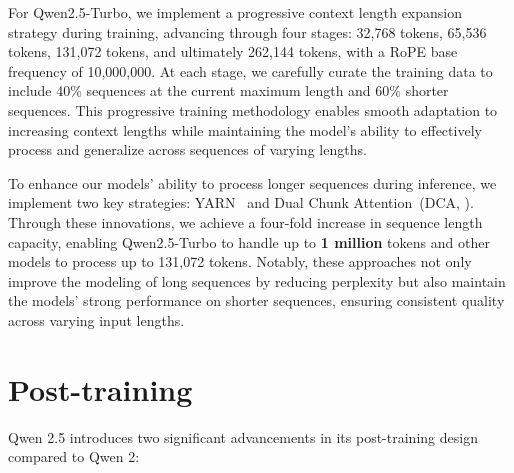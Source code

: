 \documentclass{article}
\begin{document}
For Qwen2.5-Turbo, we implement a progressive context length expansion strategy during training, advancing through four stages: 32,768 tokens, 65,536 tokens, 131,072 tokens, and ultimately 262,144 tokens, with a RoPE base frequency of 10,000,000. At each stage, we carefully curate the training data to include 40\% sequences at the current maximum length and 60\% shorter sequences. This progressive training methodology enables smooth adaptation to increasing context lengths while maintaining the model's ability to effectively process and generalize across sequences of varying lengths.

To enhance our models' ability to process longer sequences during inference, we implement two key strategies: YARN~\citep{yarn} and Dual Chunk Attention~(DCA, \citealp{chunkllama}). Through these innovations, we achieve a four-fold increase in sequence length capacity, enabling Qwen2.5-Turbo to handle up to \textbf{1 million} tokens and other models to process up to 131,072 tokens. Notably, these approaches not only improve the modeling of long sequences by reducing perplexity but also maintain the models' strong performance on shorter sequences, ensuring consistent quality across varying input lengths.

\section{Post-training}

\label{sec:post}

Qwen 2.5 introduces two significant advancements in its post-training design compared to Qwen 2:
\end{document}
